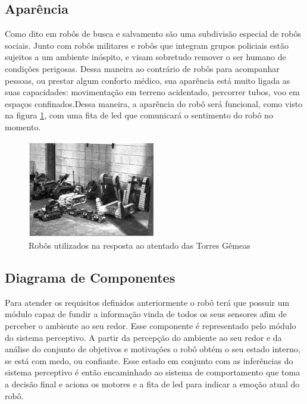 \documentclass[
	article,			%
	10pt,				%
	oneside,			%
	a4paper,			%
	english,			%
	brazil,				%
	sumario=tradicional	
	]{abntex2}
\begin{document}
\subsection{Aparência}

Como dito em \cite{Robin2004} robôs de busca e salvamento são uma subdivisão especial de robôs sociais. Junto com robôs militares e robôs que integram grupos policiais estão sujeitos a um ambiente inóspito, e visam sobretudo remover o ser humano de condições perigosas. Dessa maneira ao contrário de robôs para acompanhar pessoas, ou prestar algum conforto médico, sua aparência está muito ligada as suas capacidades: movimentação em terreno acidentado, percorrer tubos, voo em espaços confinados.Dessa maneira, a aparência do robô será funcional, como visto na figura \ref{figure:robo_wotc}, com uma fita de led que comunicará o sentimento do robô no momento.

\begin{figure}
\centering
\includegraphics[width=0.5\textwidth]{robo-wotc.png} 
\caption{Robôs utilizados na resposta ao atentado das Torres Gêmeas }
\label{figure:robo_wotc}
\end{figure}

\subsection{Diagrama de Componentes}

Para atender os requisitos definidos anteriormente o robô terá que possuir um módulo capaz de fundir a informação vinda de todos os seus sensores afim de perceber o ambiente ao seu redor. Esse componente é representado pelo módulo do sistema perceptivo. A partir da percepção do ambiente ao seu redor e da análise do conjunto de objetivos e motivações o robô obtém o seu estado interno, se está com medo, ou confiante. Esse estado em conjunto com as inferências do sistema perceptivo é então encaminhado ao sistema de comportamento que toma a decisão final e aciona os motores e a fita de led para indicar a emoção atual do robô.
\end{document}
